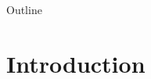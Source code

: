 \documentclass[aspectratio=169]{beamer}
\begin{document}
\begin{frame}
\titlepage
\end{frame}

\begin{frame}{Outline}
\tableofcontents
\end{frame}

\section{Introduction}



\end{document}
